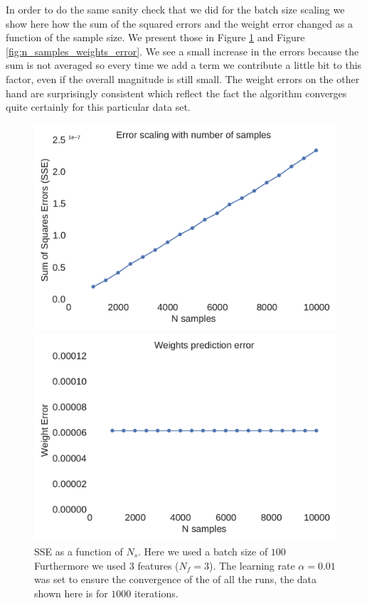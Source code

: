 \documentclass[11pt,a4paper]{article}
\begin{document}
In order to do the same sanity check that we did for the batch size scaling we show here how the sum of the squared errors
and the weight error changed as a function of the sample size. We present those in Figure \ref{fig:n_samples_error} and
Figure \ref{fig:n_samples_weights_error}. We see a small increase in the errors because the sum is not averaged so every
time we add a term we contribute a little bit to this factor, even if the overall magnitude is still small. The weight
errors on the other hand are surprisingly consistent which reflect the fact the algorithm converges quite certainly for this 
particular data set.

\begin{figure}[H]
	\centering
  \includegraphics[width=\linewidth]{errors_n_samples.pdf}
  \caption{SSE as a function of $N_s$. Here we used a batch size of $100$ Furthermore we used $3$ features ($N_f=3$). The learning rate $\alpha=0.01$ was set to ensure the convergence of the of all the runs, the data shown here is for $1000$ iterations.}
  \label{fig:n_samples_error}
\endminipage
\hfill
{}
  \includegraphics[width=\linewidth]{weights_errors_n_samples.pdf}

\end{figure}
\end{document}
